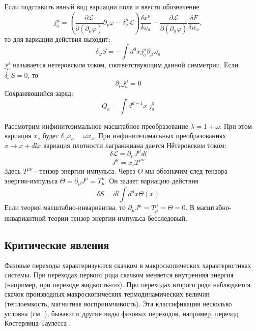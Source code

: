 \documentclass[a4paper,12pt]{article}
\theoremstyle{definition}
\theoremstyle{definition}
\theoremstyle{definition}
\begin{document}
Если подставить явный вид вариации поля и ввести обозначение
\begin{equation*}
  j^{\mu}_{a}=\left(\frac{\partial \mathcal{L}}{\partial(\partial_{\mu}\varphi)}\partial_{\nu}\varphi -\delta^{\mu}_{\nu}\mathcal{L}\right) \frac{\delta x^{\nu}}{\delta \omega_{a}}-\frac{\partial \mathcal{L}}{\partial(\partial_{\mu}\varphi)}\frac{\delta F}{\delta w_{a}},
\end{equation*}
то для вариации действия выходит:
\begin{equation*}
  \delta_{\omega}S=-\int d^{d}x j^{\mu}_{a}\partial_{\mu}\omega_{a}
\end{equation*}
$j^{\mu}_{a}$ называется нетеровским током, соответствующим данной симметрии. 
Если $\delta_{\omega} S=0$, то
\begin{equation*}
  \partial_{\mu}j^{\mu}_{a}=0
\end{equation*}
Сохраняющийся заряд:
\begin{equation*}
  Q_{a}=\int d^{d-1}x\; j^{0}_{a}
\end{equation*}

 Рассмотрим инфинитезимальное масштабное преобразование $\lambda=1+\omega$. При этом вариация $x_{\nu}$ будет $\delta_{\omega}x_{\nu}=\omega x_{\nu}$.  При инфинитезимальных преобразованиях $x\to x+dl x$ вариация плотности лагранжиана дается Нётеровским током:
\begin{equation}
  \label{eq:74}
  \delta\mathcal{L}=\partial_{\mu}J^{\mu}dl
\end{equation}
\begin{equation}
  \label{eq:75}
  J^{\mu}=x_{\nu}T^{\mu\nu}
\end{equation}
Здесь $T^{\mu\nu}$ - тензор энергии-импульса.  Через $\Theta$ мы обозначим след тензора энергии-импульса $\Theta=\partial_{\mu}J^{\mu}=T_{\mu}^{\mu}$. Он задает вариацию действия
\begin{equation}
  \label{eq:87}
  \delta S=dl \int d^d x \Theta(x)
\end{equation}
Если теория масштабно-инвариантна, то $\partial_{\mu}J^{\mu}=T_{\mu}^{\mu}=\Theta=0$. В масштабно-инвариантной теории тензор энергии-импульса бесследовый.

\subsection{Критические явления}
\label{sec:critical-phenomena}

Фазовые переходы характеризуются скачком в макроскопических характеристиках системы. При переходах первого рода скачком меняется внутренняя энергия (например, при переходе жидкость-газ). При переходах второго рода наблюдается скачок производных макроскопических термодинамических величин (теплоемкость, магнитная восприимчивость).  Эта классификация несколько условна (см. \cite{ma2000modern,ma1980}), бывают и другие виды фазовых переходов, например, переход Костерлица-Таулесса \cite{0022-3719-6-7-010}. 
\end{document}
